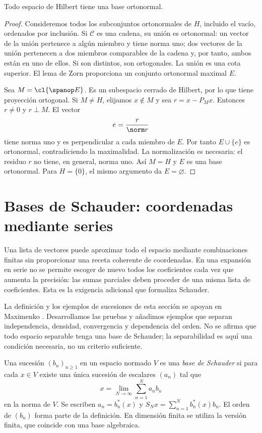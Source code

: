 \begin{teorema}\label{ch31:existencia}
Todo espacio de Hilbert tiene una base ortonormal.
\end{teorema}
\begin{proof}
Consideremos todos los subconjuntos ortonormales de $H$, incluido el vacío, ordenados por inclusión. Si $\mathcal C$ es una cadena, su unión es ortonormal: un vector de la unión pertenece a algún miembro y tiene norma uno; dos vectores de la unión pertenecen a dos miembros comparables de la cadena y, por tanto, ambos están en uno de ellos. Si son distintos, son ortogonales. La unión es una cota superior. El lema de Zorn proporciona un conjunto ortonormal maximal $E$.

Sea $M=\cl{\spanop E}$. Es un subespacio cerrado de Hilbert, por lo que tiene proyección ortogonal. Si $M\ne H$, elijamos $x\notin M$ y sea $r=x-P_Mx$. Entonces $r\ne0$ y $r\perp M$. El vector
\[
 e=\frac{r}{\norm r}
\]
tiene norma uno y es perpendicular a cada miembro de $E$. Por tanto $E\cup\{e\}$ es ortonormal, contradiciendo la maximalidad. La normalización es necesaria: el residuo $r$ no tiene, en general, norma uno. Así $M=H$ y $E$ es una base ortonormal. Para $H=\{0\}$, el mismo argumento da $E=\varnothing$.
\end{proof}

\section{Bases de Schauder: coordenadas mediante series}\label{ampl:schauder}
Una lista de vectores puede aproximar todo el espacio mediante combinaciones finitas sin proporcionar una receta coherente de coordenadas. En una expansión en serie no se permite escoger de nuevo todos los coeficientes cada vez que aumenta la precisión: las sumas parciales deben proceder de una misma lista de coeficientes. Esta es la exigencia adicional que formaliza Schauder.

La definición y los ejemplos de sucesiones de esta sección se apoyan en Maximenko \cite{max-schauder}. Desarrollamos las pruebas y añadimos ejemplos que separan independencia, densidad, convergencia y dependencia del orden. No se afirma que todo espacio separable tenga una base de Schauder; la separabilidad es aquí una condición necesaria, no un criterio suficiente.

\begin{definicion}
Una sucesión $(b_n)_{n\ge1}$ en un espacio normado $V$ es una \emph{base de Schauder} si para cada $x\in V$ existe una única sucesión de escalares $(a_n)$ tal que
\[
 x=\lim_{N\to\infty}\sum_{n=1}^Na_nb_n
\]
en la norma de $V$. Se escriben $a_n=b_n^*(x)$ y
$S_Nx=\sum_{n=1}^Nb_n^*(x)b_n$. El orden de $(b_n)$ forma parte de la definición. En dimensión finita se utiliza la versión finita, que coincide con una base algebraica.
\end{definicion}

